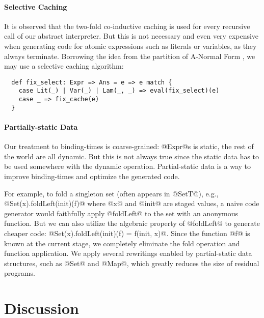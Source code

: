 \paragraph{Selective Caching} It is observed that the two-fold co-inductive
caching is used for every recursive call of our abstract interpreter. But this
is not necessary and even very expensive when generating code for atomic
expressions such as literals or variables, as they always terminate. Borrowing
the idea from the partition of A-Normal Form \cite{Flanagan:1993:ECC:155090.155113},
we may use a selective caching algorithm:

\begin{lstlisting}
  def fix_select: Expr => Ans = e => e match {
    case Lit(_) | Var(_) | Lam(_, _) => eval(fix_select)(e)
    case _ => fix_cache(e)
  }
\end{lstlisting}

\paragraph{Partially-static Data}

Our treatment to binding-times is coarse-grained: @Expr@s is static, the rest of
the world are all dynamic. But this is not always true since the static data
has to be used somewhere with the dynamic operation. Partial-static data is a
way to improve binding-times and optimize the generated code.

For example, to fold a singleton set (often appears in @SetT@), e.g.,
@Set(x).foldLeft(init)(f)@ where @x@ and @init@ are staged values, a naive code
generator would faithfully apply @foldLeft@ to the set with an anonymous
function. But we can also utilize the algebraic property of @foldLeft@ to
generate cheaper code: @Set(x).foldLeft(init)(f) = f(init, x)@. Since the
function @f@ is known at the current stage, we completely eliminate the fold
operation and function application. We apply several rewritings enabled by
partial-static data structures, such as @Set@ and @Map@, which greatly reduces
the size of residual programs.


\section{Discussion}

